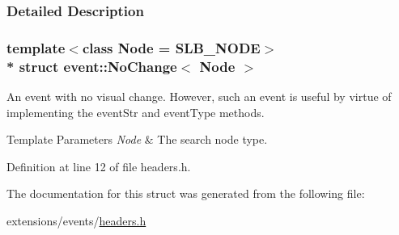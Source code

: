 \subsubsection{Detailed Description}
\subsubsection*{template$<$class Node = S\+L\+B\+\_\+\+N\+O\+DE$>$\\*
struct event\+::\+No\+Change$<$ Node $>$}

An event with no visual change. However, such an event is useful by virtue of implementing the {\ttfamily event\+Str} and {\ttfamily event\+Type} methods. 


\begin{DoxyTemplParams}{Template Parameters}
{\em Node} & The search node type. \\
\hline
\end{DoxyTemplParams}


Definition at line 12 of file headers.\+h.



The documentation for this struct was generated from the following file\+:\begin{DoxyCompactItemize}
\item 
extensions/events/\hyperlink{extensions_2events_2headers_8h}{headers.\+h}\end{DoxyCompactItemize}
